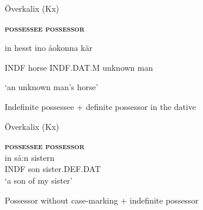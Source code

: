 \item 

Överkalix (Kx)



\textbf{\textsc{possessee}} \textbf{\textsc{possessor}}

in  hesst  ino  åokonna  kär

INDF  horse  INDF.DAT.M  unknown  man

\glt  ‘an unknown man’s horse’

\z

\item 

Indefinite possessee + definite possessor in the dative



\item 

Överkalix (Kx)



 \ea\label{}
\gll \textbf{\textsc{possessee}} \textbf{\textsc{possessor}}\\

 \ea\label{}
\gll in  så:n  sistern\\


INDF  son  sister.DEF.DAT\\

\glt ‘a son of my sister’

\z

\item 

Possessor without case-marking + indefinite possessor

